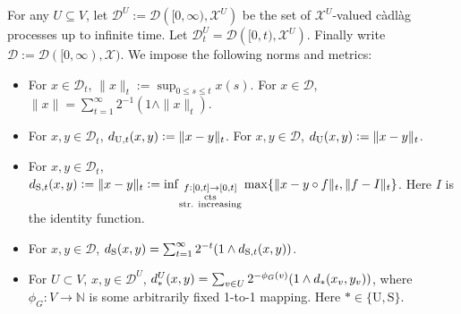 \documentclass[12pt]{article}
\newcommand{\mb}{\mathbb}
\newcommand{\mc}{\mathcal}
\newcommand{\ra}{\rightarrow}
\newcommand{\te}{\text}
\newcommand{\defeq}{:=}								%
\newcommand{\cad}{\mc{D}}							%
\newcommand{\sta}{\mc{X}}							%
\newcommand{\utmet}[1]{
\ifstrempty{#1}{
	d_{\te{U}}}{
	d_{\te{U},#1}}}									%
\newcommand{\stmet}[1]{
\ifstrempty{#1}{
	d_{\te{S}}}{
	d_{\te{S},#1}}}									%
\newcommand{\xf}{x}									%
\newcommand{\xg}{y}									%
\newcommand{\met}[2]{
\ifstrempty{#2}{
	d_{#1}}{
	d_{#1,#2}}}										%
\newcommand{\vind}[1]{_{#1}}						%
\newcommand{\tme}[1]{(#1)}							%
\newcommand{\vpara}[1]{^{#1}}						%
\newcommand{\tpara}[1]{_{#1}}						%
\begin{document}
For any \(U \subseteq V\), let \(\cad\vpara{U} := \cad\left([0,\infty),\sta^U\right)\) be the set of \(\sta^U\)-valued c\`adl\`ag processes up to infinite time. Let \(\cad\vpara{U}\tpara{t} = \cad\left([0,t),\sta^U\right)\). Finally write \(\cad \defeq \cad([0,\infty),\sta)\). We impose the following norms and metrics:

\begin{itemize}
\item For \(\xf \in \cad\tpara{t}\), \(\|\xf\|\tpara{t} \defeq \sup_{0\leq s \leq t} \xf\tme{s}\). For \(\xf \in \cad\), \(\|\xf\| = \sum_{t=1}^\infty 2^{-1}(1\wedge \|\xf\|\tpara{t})\).

\item For \(\xf,\xg \in \cad\tpara{t}\), \(\utmet{t}(\xf,\xg) \defeq \|\xf-\xg\|\tpara{t}\). For \(\xf,\xg \in \cad\), \(\utmet{}(\xf,\xg) \defeq \|\xf - \xg\|\tpara{t}\).

\item For \(\xf,\xg \in \cad\tpara{t}\), \(\stmet{t}(\xf,\xg) \defeq \|\xf-\xg\|\tpara{t} \defeq \inf_{\substack{f:[0,t]\ra[0,t]\\\te{cts}\\\te{str. increasing}}}\max\{\|\xf-\xg\circ f\|\tpara{t},\|f - I\|\tpara{t}\}\). Here \(I\) is the identity function.

\item For \(\xf,\xg \in \cad\), \(\stmet{}(\xf,\xg) = \sum_{t=1}^\infty 2^{-t}(1\wedge \stmet{t}(\xf,\xg))\).

\item For \(U \subset V\), \(\xf,\xg\in \cad\vpara{U}\), \(\met{\ast}{}\vpara{U}(\xf,\xg) = \sum_{v \in U} 2^{-\phi_G(v)}(1\wedge \met{\ast}{}(\xf\vind{v},\xg\vind{v}))\), where \(\phi_G: V \ra \mb{N}\) is some arbitrarily fixed 1-to-1 mapping. Here \(\ast \in \{\te{U},\te{S}\}\).
\end{itemize}
\end{document}
